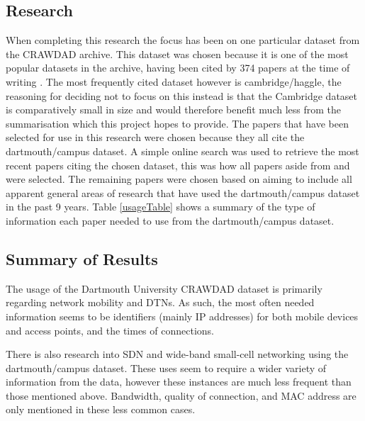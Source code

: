 \subsection{Research}

When completing this research the focus has been on one particular dataset from the CRAWDAD archive. This dataset was chosen because it is one of the most popular datasets in the archive, having been cited by 374 papers at the time of writing \cite{aboutCrawdad2014}. The most frequently cited dataset however is cambridge/haggle, the reasoning for deciding not to focus on this instead is that the Cambridge dataset is comparatively small in size and would therefore benefit much less from the summarisation which this project hopes to provide.
\newline
The papers that have been selected for use in this research were chosen because they all cite the dartmouth/campus dataset. A simple online search was used to retrieve the most recent papers citing the chosen dataset, this was how all papers aside from \cite{Wei2013} and \cite{Feng2012} were selected. The remaining papers were chosen based on aiming to include all apparent general areas of research that have used the dartmouth/campus dataset in the past 9 years. Table \ref{usageTable} shows a summary of the type of information each paper needed to use from the dartmouth/campus dataset.



\subsection{Summary of Results}
The usage of the Dartmouth University CRAWDAD dataset is primarily regarding network mobility and DTNs. As such, the most often needed information seems to be identifiers (mainly IP addresses) for both mobile devices and access points, and the times of connections.

There is also research into SDN and wide-band small-cell networking using the dartmouth/campus dataset. These uses seem to require a wider variety of information from the data, however these instances are much less frequent than those mentioned above. Bandwidth, quality of connection, and MAC address are only mentioned in these less common cases.